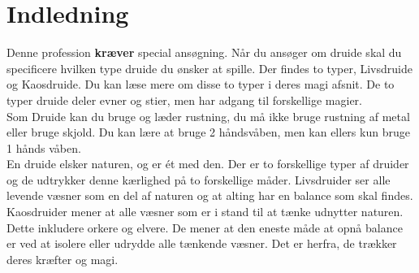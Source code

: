 \chapter{Indledning}

Denne profession \textbf{kræver} special ansøgning. Når du ansøger om druide skal du specificere hvilken type druide du ønsker at spille. Der findes to typer, Livsdruide og Kaosdruide. Du kan læse mere om disse to typer i deres magi afsnit.
De to typer druide deler evner og stier, men har adgang til forskellige magier.\\

Som Druide kan du bruge og læder rustning, du må ikke bruge rustning af metal eller bruge skjold. Du kan lære at bruge 2 håndsvåben, men kan ellers kun bruge 1 hånds våben.\\

En druide elsker naturen, og er ét med den. Der er to forskellige typer af druider og de udtrykker denne kærlighed på to forskellige måder. Livsdruider ser alle levende væsner som en del af naturen og at alting har en balance som skal findes. Kaosdruider mener at alle væsner som er i stand til at tænke udnytter naturen. Dette inkludere orkere og elvere. De mener at den eneste måde at opnå balance er ved at isolere eller udrydde alle tænkende væsner. Det er herfra, de trækker deres kræfter og magi. 